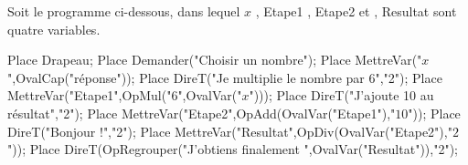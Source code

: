 \begin{exercice*}
    Soit le programme ci-dessous, dans lequel \og $x$ \fg{}, \og Etape1 \fg{}, \og Etape2 \fg{} et , \og Resultat \fg{} sont quatre variables.

    \begin{minipage}{0.6\linewidth}
        \begin{Scratch}[Echelle=0.7]
            Place Drapeau;
            Place Demander("Choisir un nombre");
            Place MettreVar("$x$",OvalCap("réponse"));
            Place DireT("Je multiplie le nombre par $6$","2");
            Place MettreVar("Etape1",OpMul("$6$",OvalVar("$x$")));
            Place DireT("J'ajoute 10 au résultat","2");
            Place MettreVar("Etape2",OpAdd(OvalVar("Etape1"),"$10$"));
            Place DireT("Bonjour !","2");
            Place MettreVar("Resultat",OpDiv(OvalVar("Etape2"),"$2$"));
            Place DireT(OpRegrouper("J'obtiens finalement ",OvalVar("Resultat")),"2");
        \end{Scratch}
    \end{minipage}    
    \begin{minipage}{0.35\linewidth}
        \vspace*{-25mm}
\end{minipage}
\end{exercice*}
